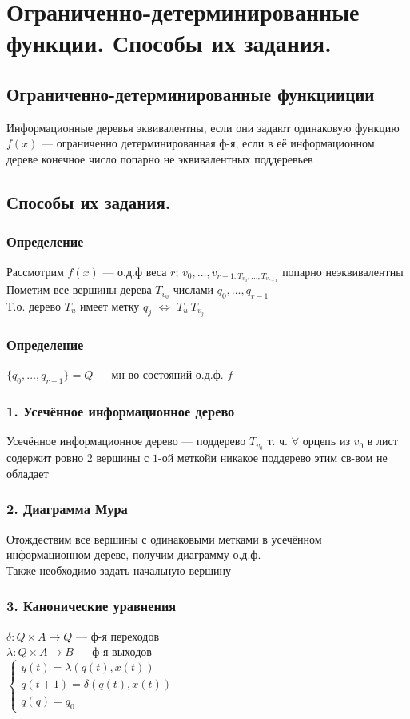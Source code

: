 \documentclass[12pt]{article}
\begin{document}
\section{Ограниченно-детерминированные функции. Способы их задания.}
\subsection{Ограниченно-детерминированные функцииции}
	Информационные деревья эквивалентны, если они задают одинаковую функцию\\
	$f(x)$ — ограниченно детерминированная ф-я, если в её информационном дереве конечное число попарно не эквивалентных поддеревьев
\subsection{Способы их задания.}
\subsubsection{Определение}
	Рассмотрим $f(x)$ — о.д.ф веса $r$; $v_0, \dotsc, v_{r-1: T_{v_0}, \dotsc, T_{v_{r-1}}}$ попарно неэквивалентны\\
	Пометим все вершины дерева $T_{v_0}$ числами $q_0, \dotsc, q_{r-1}$\\
	Т.о. дерево $T_u$ имеет метку $q_j$ $\Leftrightarrow$ $T_u ~ T_{v_j}$
\subsubsection{Определение}
	$\{q_0, \dotsc, q_{r-1}\} = Q$ — мн-во состояний о.д.ф. $f$
\subsubsection{1. Усечённое информационное дерево}
	Усечённое информационное дерево — поддерево $T_{v_0}$ т. ч. $\forall$ орцепь из $v_0$ в лист содержит ровно $2$ вершины с $1$-ой меткойи никакое поддерево этим св-вом не обладает
\subsubsection{2. Диаграмма Мура}
	Отождествим все вершины с одинаковыми метками в усечённом информационном дереве, получим диаграмму о.д.ф.\\
	Также необходимо задать начальную вершину
\subsubsection{3. Канонические уравнения}
	$\delta: Q \times A \to Q$ 	— ф-я переходов\\
	$\lambda: Q \times A \to B$	— ф-я выходов
	\\
	$\begin{cases}
		y(t) = \lambda(q(t), x(t))\\
		q(t+1) = \delta(q(t), x(t))\\
		q(q) = q_0
	\end{cases}$
\end{document}
